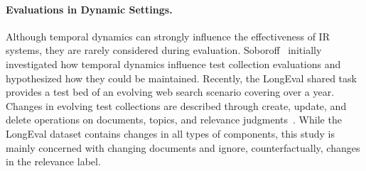 \paragraph{Evaluations in Dynamic Settings.} Although temporal dynamics can strongly influence the effectiveness of IR systems, they are rarely  considered during evaluation. Soboroff~\cite{DBLP:conf/sigir/Soboroff06} initially investigated how temporal dynamics influence test collection evaluations and hypothesized how they could be maintained. Recently, the LongEval shared task~\cite{alkhalifa:2023,DBLP:conf/clef/AlkhalifaBDEAFG24} provides a test bed of an evolving web search scenario covering over a year. Changes in evolving test collections are described through create, update, and delete operations on documents, topics, and relevance judgments~\cite{keller:2024}. While the LongEval dataset contains changes in all types of components, this study is mainly concerned with changing documents and ignore, counterfactually, changes in the relevance label.
